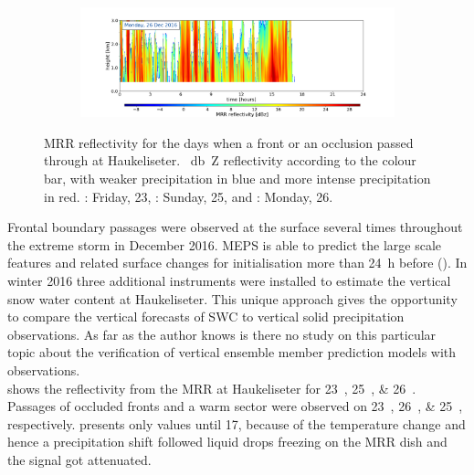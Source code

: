 \begin{figure}[h!]
\begin{subfigure}[t]{\textwidth}
		\caption{}\label{fig:ret:refl26}
	\end{subfigure}
	\begin{subfigure}[t]{\textwidth}
		\includegraphics[trim={6.5cm 0cm 5.3cm 15.5cm},clip,width=\textwidth]{./fig_MRR_refl/MRR_20161226}
	\end{subfigure}
	\caption{MRR reflectivity for the days when a front or an occlusion passed through at Haukeliseter. \SI{}{\decibel Z} reflectivity according to the colour bar, with weaker precipitation in blue and more intense precipitation in red. \protect{}: Friday, \SI{23}{\dec}, \protect{}: Sunday, \SI{25}{\dec}, and \protect{}: Monday, \SI{26}{\dec}.}\label{fig:ret:refl}
\end{figure}
\noindent
Frontal boundary passages were observed at the surface several times throughout the extreme storm in December 2016. MEPS is able to predict the large scale features and related surface changes for initialisation more than \SI{24}{\hour} before (). In winter 2016 three additional instruments were installed to estimate the vertical snow water content at Haukeliseter. This unique approach gives the opportunity to compare the vertical forecasts of SWC to vertical solid precipitation observations. As far as the author knows is there no study on this particular topic about the verification of vertical ensemble member prediction models with observations.
\\
 shows the reflectivity from the MRR at Haukeliseter for \SIlist{23;25;26}{\dec}. Passages of occluded fronts and a warm sector were observed on \SIlist{23;26;25}{\dec}, respectively.  presents only values until \SI{17}{\UTC}, because of the temperature change and hence a precipitation shift followed liquid drops freezing on the MRR dish and the signal got attenuated. 
\\
